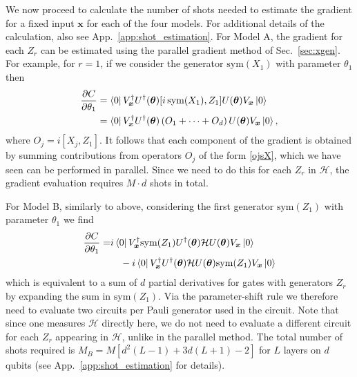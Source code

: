 \documentclass[a4paper,twocolumn,11pt,accepted=2025-09-06]{quantumarticle}
\renewcommand{\vec}{\boldsymbol}
\begin{document}



We now proceed to calculate the number of shots needed to estimate the gradient for a fixed input $\vec{x}$ for each of the four models. For additional details of the calculation, also see App.\ \ref{app:shot_estimation}. For Model A, the gradient for each $Z_r$ can be estimated using the parallel gradient method of Sec.~\ref{sec:xgen}. For example, for $r=1$, if we consider the generator $\text{sym}(X_1)$ with parameter $\theta_1$ then 
\begin{align}
    \frac{\partial C}{\partial \theta_1} &= \bra{0}V_{\vec{x}}^\dagger U^\dagger(\vec{\theta})[i\,\text{sym}(X_1),Z_1] U(\vec{\theta})V_{\vec{x}}\ket{0}\nonumber\\
    &=\bra{0}V_{\vec{x}}^\dagger U^\dagger(\vec{\theta})\left(O_1+\cdots + O_d\right) U(\vec{\theta})V_{\vec{x}}\ket{0},
\end{align}
%
where $O_j=i[X_j,Z_1]$. It follows that each component of the gradient is obtained by summing contributions from operators $O_j$ of the form \eqref{ojsX}, which we have seen can be performed in parallel. Since we need to do this for each $Z_r$ in $\mathcal{H}$, the gradient evaluation requires $M\cdot d$ shots in total. 

For Model B, similarly to above, considering the first generator $\text{sym}(Z_1)$ with parameter $\theta_1$ we find
%
\begin{align}
    \frac{\partial C}{\partial \theta_1} =& i\bra{0}V_{\vec{x}}^\dagger \text{sym}(Z_1)U^\dagger(\vec{\theta})\mathcal{H}U(\vec{\theta})V_{\vec{x}}\ket{0} \nonumber\\ &\quad- i\bra{0}V_{\vec{x}}^\dagger U^\dagger(\vec{\theta})\mathcal{H}U(\vec{\theta})\text{sym}(Z_1)V_{\vec{x}}\ket{0} 
\end{align}
%
which is equivalent to a sum of $d$ partial derivatives for gates with generators $Z_r$ by expanding the sum in $\text{sym}(Z_1)$. Via the parameter-shift rule we therefore need to evaluate two circuits per Pauli generator used in the circuit.
Note that since one measures $\mathcal{H}$ directly here, we do not need to evaluate a different circuit for each $Z_r$ appearing in $\mathcal{H}$, unlike in the parallel method. The total number of shots required is $M_B=M\left[d^2(L-1)+3d(L+1)-2\right]$ for $L$ layers on $d$ qubits (see App.\ \ref{app:shot_estimation} for details).
\end{document}
